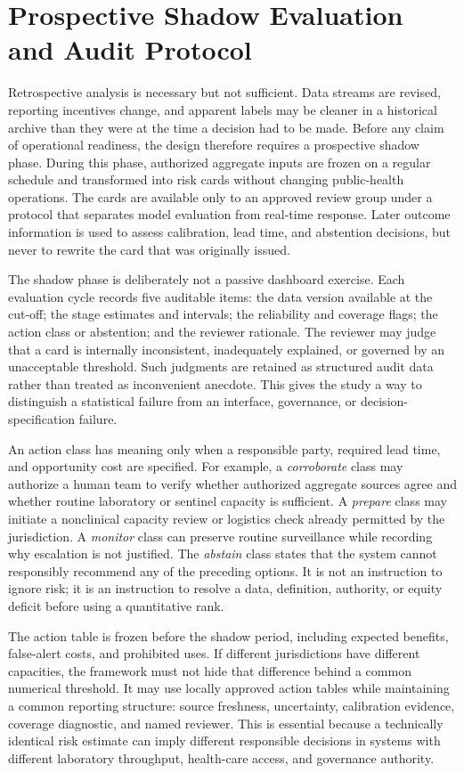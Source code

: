 \documentclass[conference]{IEEEtran}
\begin{document}
\section{Prospective Shadow Evaluation and Audit Protocol}

Retrospective analysis is necessary but not sufficient. Data streams are revised, reporting incentives change, and apparent labels may be cleaner in a historical archive than they were at the time a decision had to be made. Before any claim of operational readiness, the design therefore requires a prospective shadow phase. During this phase, authorized aggregate inputs are frozen on a regular schedule and transformed into risk cards without changing public-health operations. The cards are available only to an approved review group under a protocol that separates model evaluation from real-time response. Later outcome information is used to assess calibration, lead time, and abstention decisions, but never to rewrite the card that was originally issued.

The shadow phase is deliberately not a passive dashboard exercise. Each evaluation cycle records five auditable items: the data version available at the cut-off; the stage estimates and intervals; the reliability and coverage flags; the action class or abstention; and the reviewer rationale. The reviewer may judge that a card is internally inconsistent, inadequately explained, or governed by an unacceptable threshold. Such judgments are retained as structured audit data rather than treated as inconvenient anecdote. This gives the study a way to distinguish a statistical failure from an interface, governance, or decision-specification failure.

An action class has meaning only when a responsible party, required lead time, and opportunity cost are specified. For example, a \emph{corroborate} class may authorize a human team to verify whether authorized aggregate sources agree and whether routine laboratory or sentinel capacity is sufficient. A \emph{prepare} class may initiate a nonclinical capacity review or logistics check already permitted by the jurisdiction. A \emph{monitor} class can preserve routine surveillance while recording why escalation is not justified. The \emph{abstain} class states that the system cannot responsibly recommend any of the preceding options. It is not an instruction to ignore risk; it is an instruction to resolve a data, definition, authority, or equity deficit before using a quantitative rank.

The action table is frozen before the shadow period, including expected benefits, false-alert costs, and prohibited uses. If different jurisdictions have different capacities, the framework must not hide that difference behind a common numerical threshold. It may use locally approved action tables while maintaining a common reporting structure: source freshness, uncertainty, calibration evidence, coverage diagnostic, and named reviewer. This is essential because a technically identical risk estimate can imply different responsible decisions in systems with different laboratory throughput, health-care access, and governance authority.
\end{document}
